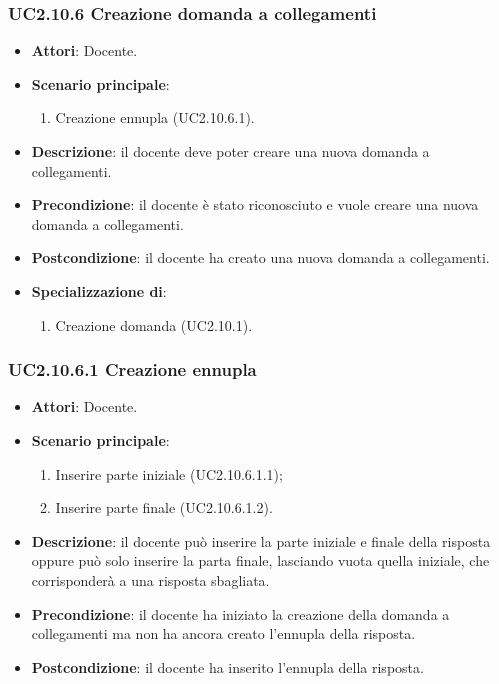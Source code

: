 \subsubsection{UC2.10.6 Creazione domanda a collegamenti}
\begin{itemize}
\item \textbf{Attori}: Docente.
\item \textbf{Scenario principale}:
\begin{enumerate}
\item Creazione ennupla (UC2.10.6.1).
\end{enumerate}
\item \textbf{Descrizione}: il docente deve poter creare una nuova domanda a collegamenti.
\item \textbf{Precondizione}: il docente è stato riconosciuto e vuole creare una nuova domanda a collegamenti.
\item \textbf{Postcondizione}: il docente ha creato una nuova domanda a collegamenti.
\item \textbf{Specializzazione di}:
\begin{enumerate}
\item Creazione domanda (UC2.10.1).
\end{enumerate}
\end{itemize}
\subsubsection{UC2.10.6.1 Creazione ennupla}
\begin{itemize}
\item \textbf{Attori}: Docente.
\item \textbf{Scenario principale}:
\begin{enumerate}
\item Inserire parte iniziale (UC2.10.6.1.1);
\item Inserire parte finale (UC2.10.6.1.2).
\end{enumerate}
\item \textbf{Descrizione}: il docente può inserire la parte iniziale e finale della risposta oppure può solo inserire la parta finale, lasciando vuota quella iniziale, che corrisponderà a una risposta sbagliata.
\item \textbf{Precondizione}: il docente ha iniziato la creazione della domanda a collegamenti ma non ha ancora creato l'ennupla della risposta.
\item \textbf{Postcondizione}: il docente ha inserito l'ennupla della risposta.
\end{itemize}
